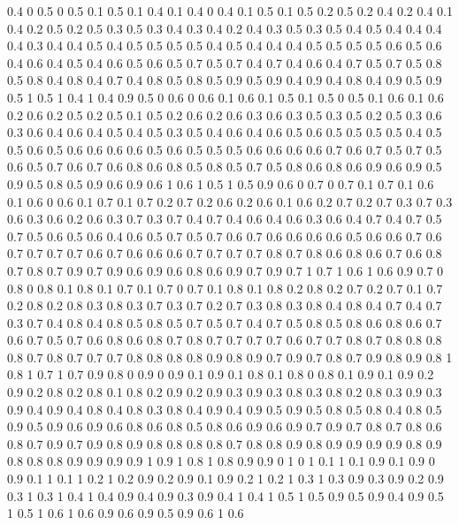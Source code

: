 0.4 0
0.5 0
0.5 0.1
0.5 0.1
0.4 0.1
0.4 0
0.4 0.1
0.5 0.1
0.5 0.2
0.5 0.2
0.4 0.2
0.4 0.1
0.4 0.2
0.5 0.2
0.5 0.3
0.5 0.3
0.4 0.3
0.4 0.2
0.4 0.3
0.5 0.3
0.5 0.4
0.5 0.4
0.4 0.4
0.4 0.3
0.4 0.4
0.5 0.4
0.5 0.5
0.5 0.5
0.4 0.5
0.4 0.4
0.4 0.5
0.5 0.5
0.5 0.6
0.5 0.6
0.4 0.6
0.4 0.5
0.4 0.6
0.5 0.6
0.5 0.7
0.5 0.7
0.4 0.7
0.4 0.6
0.4 0.7
0.5 0.7
0.5 0.8
0.5 0.8
0.4 0.8
0.4 0.7
0.4 0.8
0.5 0.8
0.5 0.9
0.5 0.9
0.4 0.9
0.4 0.8
0.4 0.9
0.5 0.9
0.5 1
0.5 1
0.4 1
0.4 0.9
0.5 0
0.6 0
0.6 0.1
0.6 0.1
0.5 0.1
0.5 0
0.5 0.1
0.6 0.1
0.6 0.2
0.6 0.2
0.5 0.2
0.5 0.1
0.5 0.2
0.6 0.2
0.6 0.3
0.6 0.3
0.5 0.3
0.5 0.2
0.5 0.3
0.6 0.3
0.6 0.4
0.6 0.4
0.5 0.4
0.5 0.3
0.5 0.4
0.6 0.4
0.6 0.5
0.6 0.5
0.5 0.5
0.5 0.4
0.5 0.5
0.6 0.5
0.6 0.6
0.6 0.6
0.5 0.6
0.5 0.5
0.5 0.6
0.6 0.6
0.6 0.7
0.6 0.7
0.5 0.7
0.5 0.6
0.5 0.7
0.6 0.7
0.6 0.8
0.6 0.8
0.5 0.8
0.5 0.7
0.5 0.8
0.6 0.8
0.6 0.9
0.6 0.9
0.5 0.9
0.5 0.8
0.5 0.9
0.6 0.9
0.6 1
0.6 1
0.5 1
0.5 0.9
0.6 0
0.7 0
0.7 0.1
0.7 0.1
0.6 0.1
0.6 0
0.6 0.1
0.7 0.1
0.7 0.2
0.7 0.2
0.6 0.2
0.6 0.1
0.6 0.2
0.7 0.2
0.7 0.3
0.7 0.3
0.6 0.3
0.6 0.2
0.6 0.3
0.7 0.3
0.7 0.4
0.7 0.4
0.6 0.4
0.6 0.3
0.6 0.4
0.7 0.4
0.7 0.5
0.7 0.5
0.6 0.5
0.6 0.4
0.6 0.5
0.7 0.5
0.7 0.6
0.7 0.6
0.6 0.6
0.6 0.5
0.6 0.6
0.7 0.6
0.7 0.7
0.7 0.7
0.6 0.7
0.6 0.6
0.6 0.7
0.7 0.7
0.7 0.8
0.7 0.8
0.6 0.8
0.6 0.7
0.6 0.8
0.7 0.8
0.7 0.9
0.7 0.9
0.6 0.9
0.6 0.8
0.6 0.9
0.7 0.9
0.7 1
0.7 1
0.6 1
0.6 0.9
0.7 0
0.8 0
0.8 0.1
0.8 0.1
0.7 0.1
0.7 0
0.7 0.1
0.8 0.1
0.8 0.2
0.8 0.2
0.7 0.2
0.7 0.1
0.7 0.2
0.8 0.2
0.8 0.3
0.8 0.3
0.7 0.3
0.7 0.2
0.7 0.3
0.8 0.3
0.8 0.4
0.8 0.4
0.7 0.4
0.7 0.3
0.7 0.4
0.8 0.4
0.8 0.5
0.8 0.5
0.7 0.5
0.7 0.4
0.7 0.5
0.8 0.5
0.8 0.6
0.8 0.6
0.7 0.6
0.7 0.5
0.7 0.6
0.8 0.6
0.8 0.7
0.8 0.7
0.7 0.7
0.7 0.6
0.7 0.7
0.8 0.7
0.8 0.8
0.8 0.8
0.7 0.8
0.7 0.7
0.7 0.8
0.8 0.8
0.8 0.9
0.8 0.9
0.7 0.9
0.7 0.8
0.7 0.9
0.8 0.9
0.8 1
0.8 1
0.7 1
0.7 0.9
0.8 0
0.9 0
0.9 0.1
0.9 0.1
0.8 0.1
0.8 0
0.8 0.1
0.9 0.1
0.9 0.2
0.9 0.2
0.8 0.2
0.8 0.1
0.8 0.2
0.9 0.2
0.9 0.3
0.9 0.3
0.8 0.3
0.8 0.2
0.8 0.3
0.9 0.3
0.9 0.4
0.9 0.4
0.8 0.4
0.8 0.3
0.8 0.4
0.9 0.4
0.9 0.5
0.9 0.5
0.8 0.5
0.8 0.4
0.8 0.5
0.9 0.5
0.9 0.6
0.9 0.6
0.8 0.6
0.8 0.5
0.8 0.6
0.9 0.6
0.9 0.7
0.9 0.7
0.8 0.7
0.8 0.6
0.8 0.7
0.9 0.7
0.9 0.8
0.9 0.8
0.8 0.8
0.8 0.7
0.8 0.8
0.9 0.8
0.9 0.9
0.9 0.9
0.8 0.9
0.8 0.8
0.8 0.9
0.9 0.9
0.9 1
0.9 1
0.8 1
0.8 0.9
0.9 0
1 0
1 0.1
1 0.1
0.9 0.1
0.9 0
0.9 0.1
1 0.1
1 0.2
1 0.2
0.9 0.2
0.9 0.1
0.9 0.2
1 0.2
1 0.3
1 0.3
0.9 0.3
0.9 0.2
0.9 0.3
1 0.3
1 0.4
1 0.4
0.9 0.4
0.9 0.3
0.9 0.4
1 0.4
1 0.5
1 0.5
0.9 0.5
0.9 0.4
0.9 0.5
1 0.5
1 0.6
1 0.6
0.9 0.6
0.9 0.5
0.9 0.6
1 0.6
